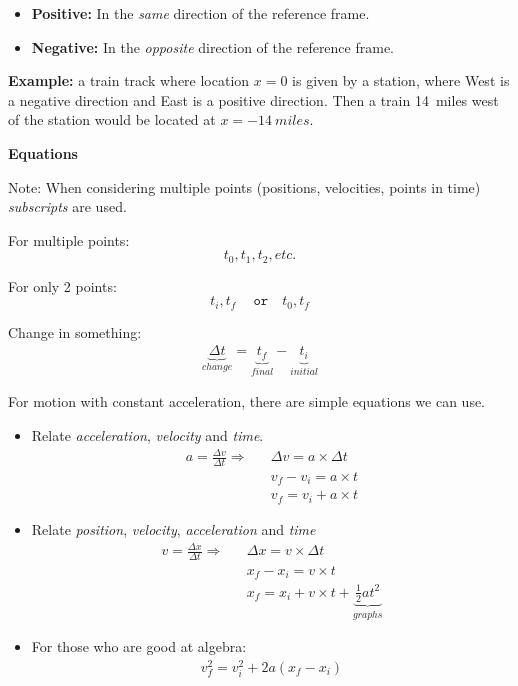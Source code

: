 \documentclass[12pt]{article}
\begin{document}
\begin{itemize}
	\item \textbf{Positive:} In the \textit{same} direction of the reference frame.
	\item \textbf{Negative:} In the \textit{opposite} direction of the reference frame.
\end{itemize}

\noindent \textbf{Example:} a train track where location $x=0$ is given by a station, where West is a negative direction and East is a positive direction. Then a train 14~miles west of the station would be located at $x = -14~miles$.

\begin{center}\end{center}

\noindent \textbf{\large Equations}

Note: When considering multiple points (positions, velocities, points in time) \textit{subscripts} are used.

For multiple points:
\begin{equation}
t_0, t_1, t_2, etc.
\end{equation}

For only 2 points:
\begin{equation}
t_i, t_f ~\quad \texttt{or} \quad t_0, t_f
\end{equation}

Change in something:
\begin{eqnarray}
\underbrace{\Delta t}_{change} = \underbrace{t_f}_{final} - \underbrace{t_i}_{initial}
\end{eqnarray}

\clearpage

For motion with constant acceleration, there are simple equations we can use.

\begin{itemize}
	\item Relate \textit{acceleration}, \textit{velocity} and \textit{time}.
	\begin{eqnarray}
	a = \frac{\Delta v}{\Delta t} \Rightarrow & &\Delta v = a\times \Delta t\\
	& & v_f - v_i = a\times t \\
	& & v_f = v_i + a\times t
	\end{eqnarray}
	\item Relate \textit{position}, \textit{velocity}, \textit{acceleration} and \textit{time}
	\begin{eqnarray}
	v = \frac{\Delta x}{\Delta t} \Rightarrow & & \Delta x = v \times \Delta t \\
	& & x_f - x_i = v\times t \\
	& & x_f = x_i + v\times t +\underbrace{\frac{1}{2}at^2}_{graphs}
	\end{eqnarray}
	\item For those who are good at algebra:
	\begin{eqnarray}
	v_f^2 = v_i^2 + 2a(x_f-x_i)
	\end{eqnarray}
\end{itemize}
\end{document}
